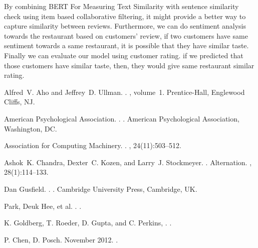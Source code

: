 \documentclass[11pt]{article}
\begin{document}
By combining BERT For Measuring Text Similarity with sentence similarity check using item based collaborative filtering, it might provide a better way to capture similarity between reviews. Furthermore, we can do sentiment analysis towards the restaurant based on customers' review, if two customers have same sentiment towards a same restaurant, it is possible that they have similar taste. Finally we can evaluate our model using customer rating. if we predicted that those customers have similar taste, then, they would give same restaurant similar rating.




\begin{thebibliography}{}

Alfred~V. Aho and Jeffrey~D. Ullman.
.
, volume~1.
\newblock Prentice-{Hall}, Englewood Cliffs, NJ.

{American Psychological Association}.
.
.
\newblock American Psychological Association, Washington, DC.

{Association for Computing Machinery}.
.
, 24(11):503--512.

Ashok~K. Chandra, Dexter~C. Kozen, and Larry~J. Stockmeyer.
.
\newblock Alternation.
,
  28(1):114--133.

Dan Gusfield.
.
.
\newblock Cambridge University Press, Cambridge, UK.

Park, Deuk Hee, et al.
.
.

K. Goldberg, T. Roeder, D. Gupta, and C. Perkins,
.
.

P. Chen, D. Posch.
\newblock November 2012.
.

\end{thebibliography}
\end{document}

